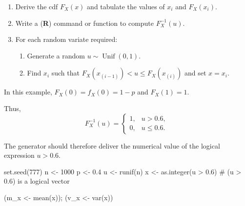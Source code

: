 \documentclass[
  letterpaper,
  DIV=11,
  numbers=noendperiod]{scrreprt}
\newenvironment{Shaded}{\begin{snugshade}}{\end{snugshade}}
\newcommand{\CommentTok}[1]{\textcolor[rgb]{0.37,0.37,0.37}{#1}}
\newcommand{\DecValTok}[1]{\textcolor[rgb]{0.68,0.00,0.00}{#1}}
\newcommand{\FloatTok}[1]{\textcolor[rgb]{0.68,0.00,0.00}{#1}}
\newcommand{\FunctionTok}[1]{\textcolor[rgb]{0.28,0.35,0.67}{#1}}
\newcommand{\NormalTok}[1]{\textcolor[rgb]{0.00,0.23,0.31}{#1}}
\newcommand{\OtherTok}[1]{\textcolor[rgb]{0.00,0.23,0.31}{#1}}
\newcommand{\SpecialCharTok}[1]{\textcolor[rgb]{0.37,0.37,0.37}{#1}}
\providecommand{\tightlist}{%
  \setlength{\itemsep}{0pt}\setlength{\parskip}{0pt}}
\begin{document}
\begin{tcolorbox}[enhanced jigsaw, bottomrule=.15mm, colframe=quarto-callout-note-color-frame, left=2mm, colbacktitle=quarto-callout-note-color!10!white, opacityback=0, rightrule=.15mm, bottomtitle=1mm, toptitle=1mm, coltitle=black, title=\textcolor{quarto-callout-note-color}{\faInfo}\hspace{0.5em}{Procedure with ITM for discrete case}, titlerule=0mm, arc=.35mm, leftrule=.75mm, toprule=.15mm, opacitybacktitle=0.6, colback=white, breakable]

\begin{enumerate}
\def\labelenumi{\arabic{enumi}.}
\item
  Derive the cdf \(F_X(x)\) and tabulate the values of \(x_i\) and
  \(F_X(x_i)\).
\item
  Write a (\textbf{R}) command or function to compute \(F_X^{-1}(u)\).
\item
  For each random variate required:

  \begin{enumerate}
  \def\labelenumii{\roman{enumii})}
  \tightlist
  \item
    Generate a random \(u\sim \operatorname{Unif}(0,1)\).
  \item
    Find \(x_i\) such that \(F_X(x_{(i-1)}) < u \leq F_X(x_{(i)})\) and
    set \(x = x_i\).
  \end{enumerate}
\end{enumerate}

\end{tcolorbox}

In this example, \(F_X(0) = f_X(0) = 1 - p\) and \(F_X(1) = 1\).

Thus, \[
F_X^{-1}(u) = 
\begin{cases}
1, & u > 0.6,\\
0, & u \leq 0.6.
\end{cases}
\]

The generator should therefore deliver the numerical value of the
logical expression \(u > 0.6\).

\begin{Shaded}
\begin{Highlighting}[]
\FunctionTok{set.seed}\NormalTok{(}\DecValTok{777}\NormalTok{)}
\NormalTok{n }\OtherTok{\textless{}{-}} \DecValTok{1000}
\NormalTok{p }\OtherTok{\textless{}{-}} \FloatTok{0.4}
\NormalTok{u }\OtherTok{\textless{}{-}} \FunctionTok{runif}\NormalTok{(n)}
\NormalTok{x }\OtherTok{\textless{}{-}} \FunctionTok{as.integer}\NormalTok{(u }\SpecialCharTok{\textgreater{}} \FloatTok{0.6}\NormalTok{)  }\CommentTok{\# (u \textgreater{} 0.6) is a logical vector}

\NormalTok{(m\_x }\OtherTok{\textless{}{-}} \FunctionTok{mean}\NormalTok{(x));  (v\_x }\OtherTok{\textless{}{-}} \FunctionTok{var}\NormalTok{(x))}
\end{Highlighting}
\end{Shaded}
\end{document}

